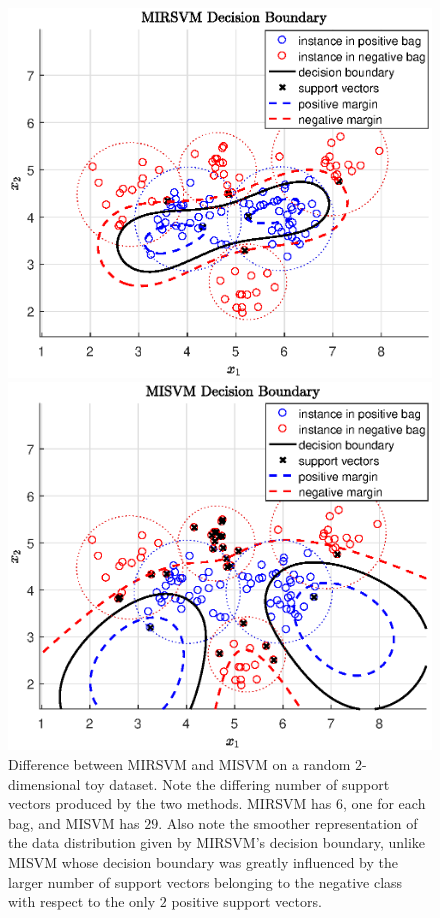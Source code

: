 \documentclass[reqno]{vcuthesis}
\numberwithin{equation}{chapter}
\begin{document}
\begin{figure}[t!]
    \centering
    \begin{minipage}{0.5\textwidth}
        \centering
        \includegraphics[width=\textwidth]{figures/mirsvm_figure.eps} %
    \end{minipage}\hfill
    \begin{minipage}{0.5\textwidth}
        \centering
        \includegraphics[width=\textwidth]{figures/misvm_figure.eps} %
    \end{minipage}
    \caption{\small Difference between MIRSVM and MISVM on a random $2$-dimensional toy dataset. Note the differing number of support vectors produced by the two methods. MIRSVM has $6$, one for each bag, and MISVM has $29$. Also note the smoother representation of the data distribution given by MIRSVM's decision boundary, unlike MISVM whose decision boundary was greatly influenced by the larger number of support vectors belonging to the negative class with respect to the only $2$ positive support vectors.}\label{fig:diff}
\end{figure}
\end{document}

